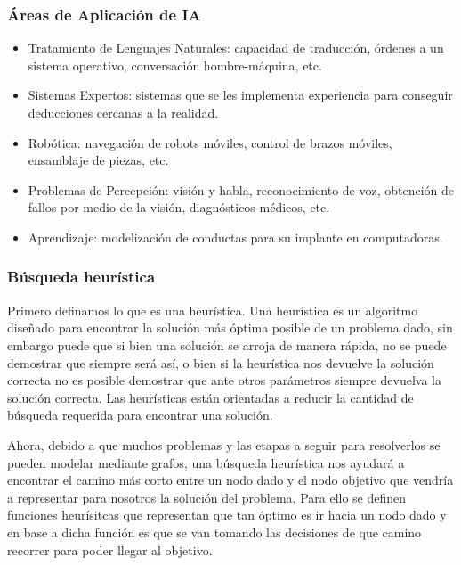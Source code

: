 \documentclass[a4paper]{article}
\begin{document}
\subsubsection*{\'Areas de Aplicaci\'on de IA}
\begin{itemize}
\item Tratamiento de Lenguajes Naturales: capacidad de traducción, órdenes a un sistema operativo, conversación hombre-máquina, etc.
\item Sistemas Expertos: sistemas que se les implementa experiencia para conseguir deducciones cercanas a la realidad.
\item Robótica: navegación de robots móviles, control de brazos móviles, ensamblaje de piezas, etc.
\item Problemas de Percepción: visión y habla, reconocimiento de voz, obtención de fallos por medio de la visión, diagnósticos médicos, etc.
\item Aprendizaje: modelización de conductas para su implante en computadoras.
\end{itemize}

\subsubsection*{B\'usqueda heur\'istica}
Primero definamos lo que es una heurística. Una heurística es un algoritmo diseñado para encontrar la solución más óptima posible de un problema dado, sin embargo puede que si bien una solución se arroja de manera rápida, no se puede demostrar que siempre será así, o bien si la heurística nos devuelve la solución correcta no es posible demostrar que ante otros parámetros siempre devuelva la solución correcta. Las heurísticas están orientadas a reducir la cantidad de búsqueda requerida para encontrar una solución.

Ahora, debido a que muchos problemas y las etapas a seguir para resolverlos se pueden modelar mediante grafos, una búsqueda heurística nos ayudará a encontrar el camino más corto entre un nodo dado y el nodo objetivo que vendría a representar para nosotros la solución del problema. Para ello se definen funciones heurísitcas que representan que tan óptimo es ir hacia un nodo dado y en base a dicha función es que se van tomando las decisiones de que camino recorrer para poder llegar al objetivo.
\end{document}
